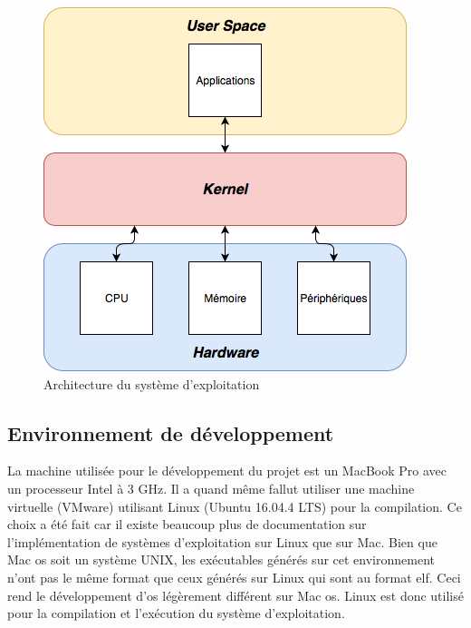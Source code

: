 \begin{figure}[!h]
    \centering
    \includegraphics[scale=0.75]{images/kernel.png}
    \caption{Architecture du système d'exploitation}
    \label{os_arch}
\end{figure}


\subsection{Environnement de développement}
La machine utilisée pour le développement du projet est un MacBook Pro avec un
processeur Intel à 3 GHz. Il a quand même fallut utiliser une machine virtuelle
(VMware) utilisant Linux (Ubuntu 16.04.4 LTS) pour la compilation. Ce choix a été
fait car il existe beaucoup plus de documentation sur l'implémentation de systèmes
d'exploitation sur Linux que sur Mac. Bien que Mac \acrshort{os} soit un système
UNIX, les exécutables générés sur cet environnement n'ont pas le même format que
ceux générés sur Linux qui sont au format \acrshort{elf}. Ceci rend le développement
d'\acrshort{os} légèrement différent sur Mac \acrshort{os}. Linux est donc utilisé
pour la compilation et l'exécution du système d'exploitation. \\

